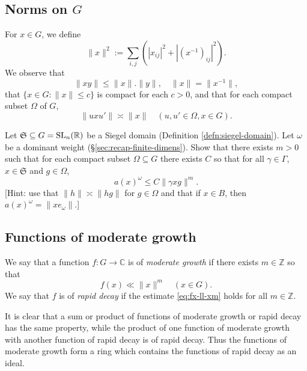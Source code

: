 \documentclass[reqno]{amsart} 
\begin{document}
\subsection{Norms on $G$}
For $x \in G$, we define
\begin{equation*}
  \|x\|^2 := \sum _{i, j } \left(|x_{i j}|^2 + |(x^{-1})_{i j}|^2\right).
\end{equation*}
We observe that
\begin{equation*}
  \|x y\| \leq \|x\| . \|y\|, \quad \|x\| = \|x^{-1}\|,
\end{equation*}
that $\{x \in G : \|x\| \leq c\}$ is compact for each $c > 0$, and that for each compact subset $\Omega$ of $G$,
\begin{equation}\label{eq:u-x-u}
  \|u x u'\| \asymp \|x\| \quad (u, u' \in \Omega, x \in G).
\end{equation}

\begin{exercise}
  Let $\mathfrak{S} \subseteq G = \operatorname{SL}_n(\mathbb{R})$ be a Siegel domain (Definition \ref{defn:siegel-domain}).
  Let $\omega$ be a dominant weight (\S\ref{sec:recap-finite-dimens}).
  Show that there exists $m > 0$ such that for each compact subset $\Omega \subseteq G$ there exists $C$ so that for all $\gamma \in \Gamma$, $x \in \mathfrak{S}$ and $g \in \Omega$,
  \begin{equation*}
    a(x)^{\omega} \leq C \|\gamma x g\|^m.
  \end{equation*}
  [Hint: use that $\|h\| \asymp \|h g\|$ for $g \in \Omega$ and that if $x \in B$, then $a(x)^{\omega} = \|x e_\omega \|$.]
\end{exercise}


\subsection{Functions of moderate growth}\label{sec:funct-moder-growth}
We say that a function $f : G \rightarrow \mathbb{C}$ is of \emph{moderate growth} if there exists $m \in \mathbb{Z}$ so that
\begin{equation}\label{eq:fx-ll-xm}
  f(x) \ll \|x\|^m
  \quad (x \in G).
\end{equation}
We say that $f$ is of \emph{rapid decay} if the estimate \eqref{eq:fx-ll-xm} holds for all $m \in \mathbb{Z}$.

It is clear that a sum or product of functions of moderate growth or rapid decay has the same property, while the product of one function of moderate growth with another function of rapid decay is of rapid decay.  Thus the functions of moderate growth form a ring which contains the functions of rapid decay as an ideal.
\end{document}
